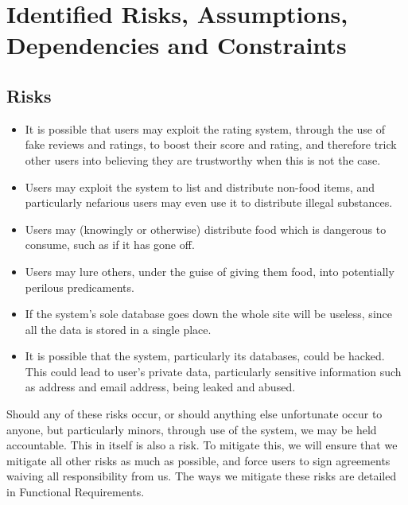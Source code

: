 \documentclass[12pt]{article}
\begin{document}
\section{Identified Risks, Assumptions, Dependencies and Constraints}
\subsection{Risks}
\begin{itemize}

    \item It is possible that users may exploit the rating system,
        through the use of fake reviews and ratings,
        to boost their score and rating, and therefore trick
        other users into believing they are trustworthy when this is not the case.

    \item Users may exploit the system to list and distribute non-food items,
        and particularly nefarious users may even use it to distribute illegal substances.
    
    \item Users may (knowingly or otherwise) distribute food which is dangerous
        to consume, such as if it has gone off.
    
    \item Users may lure others, under the guise of giving them food, into
        potentially perilous predicaments.
    
    \item If the system’s sole database goes down the whole site will be
        useless, since all the data is stored in a single place.
    
    \item It is possible that the system, particularly its databases, could be hacked.
        This could lead to user’s private data, particularly sensitive
        information such as address and email address, being leaked and abused.
    
    \end{itemize}

Should any of these risks occur, or should anything else unfortunate occur
to anyone, but particularly minors, through use of the system,
we may be held accountable.
This in itself is also a risk.
To mitigate this, we will ensure that we mitigate all other risks as much
as possible, and force users to sign agreements waiving all responsibility from us.
The ways we mitigate these risks are detailed in Functional Requirements.
\end{document}
